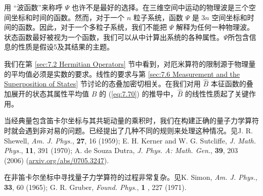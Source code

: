     \begin{center}
    \end{center}

    用 “波函数”来称呼 $\Psi$ 也许不是最好的选择。在三维空间中运动的物理波是三个空间坐标和时间的函数。然而，对于一个 $n$ 粒子系统，函数 $\Psi$ 是 $3n$ 空间坐标和时间的函数。因此，对于一个多粒子系统，我们不能把 $\Psi$ 解释为任何一种物理波。状态函数最好被视为一个函数，我们可以从中计算出系统的各种属性。$\Psi$所包含信息的性质是假设5及其结果的主题。

    \begin{center}
    \end{center}

    我们在第 \ref{sec:7.2 Hermitian Operators} 节中看到，对厄米算符的限制源于物理量的平均值必须是实数的要求。线性的要求与第 \ref{sec:7.6 Measurement and the Superposition of States} 节讨论的态叠加密切相关。在我们对用 $\hat{B}$ 本征函数的叠加展开的状态其属性平均值 $B$ 的 (\ref{eq:7.70}) 的推导中，$\hat{B}$ 的线性性质起了关键作用。

    当经典量包含笛卡尔坐标与其共轭动量的乘积时，我们在构建正确的量子力学算符时就会遇到非对易的问题。已经提出了几种不同的规则来处理这种情况。见J. R. Shewell, \textit{Am. J. Phys.}, \textbf{27}, 16 (1959); E. H. Kerner and W. G. Sutcliffe, \textit{J. Math. Phys.}, \textbf{11}, 391 (1970); A. de Souza Dutra, \textit{J. Phys. A: Math. Gen.}, \textbf{39}, 203 (2006) (\url{arxiv.org/abs/0705.3247}).

    在非笛卡尔坐标中寻找量子力学算符的过程非常复杂。见K. Simon, \textit{Am. J. Phys.}, \textbf{33}, 60 (1965); G. R. Gruber, \textit{Found. Phys.}, \textbf{1} , 227 (1971).

    \begin{center}
    \end{center}

